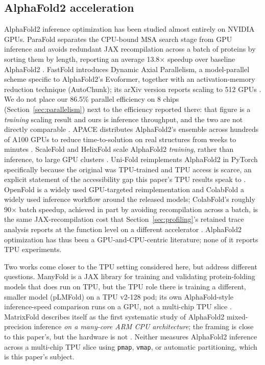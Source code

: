 
\subsection{AlphaFold2 acceleration}
\label{sec:rw-alphafold}

AlphaFold2 inference optimization has been studied almost entirely on
NVIDIA GPUs. ParaFold separates the CPU-bound MSA search stage from
GPU inference and avoids redundant JAX recompilation across a batch of
proteins by sorting them by length, reporting an average 13.8$\times$
speedup over baseline AlphaFold2 \citep{zhong2022parafold}. FastFold
introduces Dynamic Axial Parallelism, a model-parallel scheme specific
to AlphaFold2's Evoformer, together with an activation-memory reduction
technique (AutoChunk); its arXiv version reports scaling to 512 GPUs
\citep{cheng2022fastfoldarxiv}. We do not place our 86.5\% parallel
efficiency on 8 chips (Section~\ref{sec:parallelism}) next to the
efficiency reported there: that figure is a \emph{training} scaling
result and ours is inference throughput, and the two are not directly
comparable \citep{cheng2024fastfold,cheng2022fastfoldarxiv}. APACE distributes
AlphaFold2's ensemble across hundreds of A100 GPUs to reduce
time-to-solution on real structures from weeks to minutes
\citep{apace2024}. ScaleFold and HelixFold scale AlphaFold2
\emph{training}, rather than inference, to large GPU clusters
\citep{scalefold2024,helixfold2022}. Uni-Fold reimplements AlphaFold2 in
PyTorch specifically because the original was TPU-trained and TPU
access is scarce, an explicit statement of the accessibility gap this
paper's TPU results speak to \citep{unifold}. OpenFold is a widely used GPU-targeted
reimplementation and ColabFold a widely used inference workflow around
the released models; ColabFold's roughly
90$\times$ batch speedup, achieved in part by avoiding recompilation
across a batch, is the same JAX-recompilation cost that
Section~\ref{sec:profiling}'s retained trace analysis reports at the
function level on a different accelerator \citep{openfold2024,colabfold2022}.
AlphaFold2 optimization has thus been a GPU-and-CPU-centric
literature; none of it reports TPU experiments.

Two works come closer to the TPU setting considered here, but address
different questions. ManyFold is a JAX library for
training and validating protein-folding models that does run on TPU,
but the TPU role there is training a different, smaller model
(pLMFold) on a TPU v2-128 pod; its own AlphaFold-style inference-speed
comparison runs on a GPU, not a multi-chip TPU slice
\citep{villegas-morcillo2023manyfold}. MatrixFold describes itself as
the first systematic study of AlphaFold2 mixed-precision inference
\emph{on a many-core ARM CPU architecture}; the framing is close to
this paper's, but the hardware is not
\citep{matrixfold2026}. Neither measures AlphaFold2 inference across a
multi-chip TPU slice using \texttt{pmap}, \texttt{vmap}, or automatic
partitioning, which
is this paper's subject.

